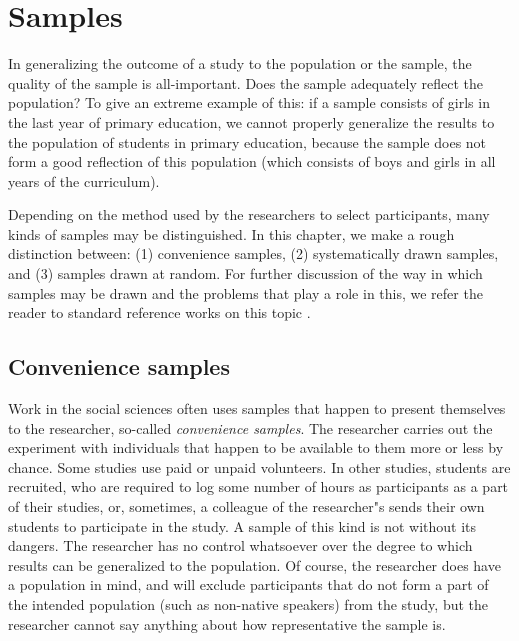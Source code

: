 \documentclass[
]{book}
\begin{document}
\hypertarget{ch:samples}{%
\chapter{Samples}\label{ch:samples}}

In generalizing the outcome of a study to the population or the sample, the quality of the sample is all-important. Does the sample adequately reflect the population? To give an extreme example of this: if a sample consists of girls in the last year of primary education, we cannot properly generalize the results to the population of students in primary education, because the sample does not form a good reflection of this population (which consists of boys and girls in all years of the curriculum).

Depending on the method used by the researchers to select participants, many kinds of samples may be distinguished. In this chapter, we make a rough distinction between: (1) convenience samples, (2) systematically drawn samples, and (3) samples drawn at random. For further discussion of the way in which samples may be drawn and the problems that play a role in this, we refer the reader to standard reference works on this topic \citep{Coch77, Thom12}.

\hypertarget{sec:convenience-samples}{%
\section{Convenience samples}\label{sec:convenience-samples}}

Work in the social sciences often uses samples that happen to present themselves to the researcher, so-called \emph{convenience samples}. The researcher carries out the experiment with individuals that happen to be available to them more or less by chance. Some studies use paid or unpaid volunteers. In other studies, students are recruited, who are required to log some number of hours as participants as a part of their studies, or, sometimes, a colleague of the researcher"s sends their own students to participate in the study. A sample of this kind is not without its dangers. The researcher has no control whatsoever over the degree to which results can be generalized to the population. Of course, the researcher does have a population in mind, and will exclude participants that do not form a part of the intended population (such as non-native speakers) from the study, but the researcher cannot say anything about how representative the sample is.
\end{document}
